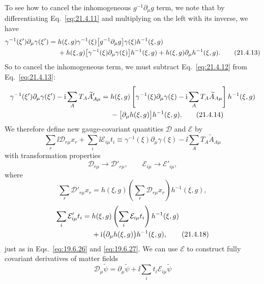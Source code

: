 To see how to cancel the inhomogeneous $g^{-1}\partial_\mu g$ term, we note that by differentiating Eq.~\eqref{eq:21.4.11} and multiplying on the left with its inverse, we have
\begin{align}
\gamma^{-1}(\xi')\partial_\mu\gamma(\xi')
={}&h(\xi,g)\gamma^{-1}(\xi)
\bigl[g^{-1}\partial_\mu g\bigr]\gamma(\xi)h^{-1}(\xi,g)
\notag\\
&+h(\xi,g)
\bigl[\gamma^{-1}(\xi)\partial_\mu\gamma(\xi)\bigr]
h^{-1}(\xi,g)
+h(\xi,g)\partial_\mu h^{-1}(\xi,g).
\tag{21.4.13}\label{eq:21.4.13}
\end{align}
So to cancel the inhomogeneous term, we must subtract Eq.~\eqref{eq:21.4.12} from Eq.~\eqref{eq:21.4.13}:
\begin{align}
\gamma^{-1}(\xi')\partial_\mu\gamma(\xi')
-\mathrm{i}\sum_A T_A\widetilde A'_{A\mu}
={}&h(\xi,g)
\left[
\gamma^{-1}(\xi)\partial_\mu\gamma(\xi)
-\mathrm{i}\sum_A T_A\widetilde A_{A\mu}
\right]
h^{-1}(\xi,g)
\notag\\
&-\bigl[\partial_\mu h(\xi,g)\bigr]h^{-1}(\xi,g).
\tag{21.4.14}\label{eq:21.4.14}
\end{align}
We therefore define new gauge-covariant quantities $\mathcal D$ and $\mathcal E$ by
\begin{equation}
\sum_r \ii\mathcal D_{r\mu}x_r+\sum_i \ii\mathcal E_{i\mu}t_i
\equiv
\gamma^{-1}(\xi)\partial_\mu\gamma(\xi)
-\ii\sum_A T_A\widetilde A_{A\mu}
\tag{21.4.15}\label{eq:21.4.15}
\end{equation}
with transformation properties
\begin{equation}
\mathcal D_{r\mu}\longrightarrow\mathcal D'_{r\mu},
\qquad
\mathcal E_{i\mu}\longrightarrow\mathcal E'_{i\mu},
\tag{21.4.16}\label{eq:21.4.16}
\end{equation}
where
\begin{equation}
\sum_r\mathcal D'_{r\mu}x_r
=h(\xi,g)
\left(\sum_r\mathcal D_{r\mu}x_r\right)
h^{-1}(\xi,g),
\tag{21.4.17}\label{eq:21.4.17}
\end{equation}
\begin{align}
\sum_i\mathcal E'_{i\mu}t_i
={}&h(\xi,g)
\left(\sum_i\mathcal E_{i\mu}t_i\right)
h^{-1}(\xi,g)
\notag\\
&+\mathrm{i}\bigl(\partial_\mu h(\xi,g)\bigr)h^{-1}(\xi,g),
\tag{21.4.18}\label{eq:21.4.18}
\end{align}
just as in Eqs.~\eqref{eq:19.6.26} and \eqref{eq:19.6.27}. We can use $\mathcal E$ to construct fully covariant derivatives of matter fields
\begin{equation}
\mathcal D_\mu\widetilde\psi
=\partial_\mu\widetilde\psi
+\ii\sum_i t_i\mathcal E_{i\mu}\widetilde\psi
\tag{21.4.19}\label{eq:21.4.19}
\end{equation}
